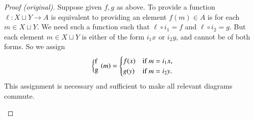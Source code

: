 \documentclass{book}
\def\tn{\textnormal}
\def\to{\rightarrow}
\def\taking{\colon}
\newcommand{\coprodmap}[2]{{\left\{\parbox{.1in}{#1\\#2}\right.}}
\theoremstyle{theoremENG}
\theoremstyle{lemmaENG}
\newtheorem{lemmaENG}[subsubsection]{\begin{english}Lemma\end{english}}
\theoremstyle{propositionENG}
\theoremstyle{corollaryENG}
\theoremstyle{factENG}
\theoremstyle{remarkENG}
\theoremstyle{exampleENG}
\newtheorem{exampleENG}[subsubsection]{\begin{english}Example\end{english}}
\theoremstyle{warningENG}
\theoremstyle{questionENG}
\theoremstyle{guessENG}
\theoremstyle{answerENG}
\theoremstyle{constructionENG}
\theoremstyle{rulesENG}
\theoremstyle{excENG}
\theoremstyle{appENG}
\theoremstyle{definitionENG}
\theoremstyle{notationENG}
\theoremstyle{conjectureENG}
\theoremstyle{postulateENG}
\newenvironment{proofENG}{\begin{proof}[Proof (original)]}{\end{proof}}
\theoremstyle{theoremRUS}
\theoremstyle{lemmaRUS}
\theoremstyle{propositionRUS}
\theoremstyle{corollaryRUS}
\theoremstyle{factRUS}
\theoremstyle{remarkRUS}
\theoremstyle{exampleRUS}
\theoremstyle{warningRUS}
\theoremstyle{questionRUS}
\theoremstyle{guessRUS}
\theoremstyle{answerRUS}
\theoremstyle{constructionRUS}
\theoremstyle{rulesRUS}
\theoremstyle{excRUS}
\theoremstyle{appRUS}
\theoremstyle{definitionRUS}
\theoremstyle{notationRUS}
\theoremstyle{conjectureRUS}
\theoremstyle{postulateRUS}
\begin{document}
\begin{english}
\begin{lemmaENG}
\begin{russian} \end{russian}

\end{lemmaENG}

\begin{proofENG}

Suppose given $f,g$ as above. To provide a function $\ell\taking X\sqcup Y\to A$ is equivalent to providing an element $f(m)\in A$ is for each $m\in X\sqcup Y$. We need such a function such that $\ell\circ i_1=f$ and $\ell\circ i_2=g$. But each element $m\in X\sqcup Y$ is either of the form $i_1x$ or $i_2y$, and cannot be of both forms. So we assign 
$$\coprodmap{f}{g}(m)=\begin{cases}f(x)&\tn{if } m=i_1x,\\ g(y) &\tn{if }m=i_2y.\end{cases}$$
This assignment is necessary and sufficient to make all relevant diagrams commute.

\begin{russian} \end{russian}

\end{proofENG}

\begin{exampleENG}


\end{exampleENG}
\end{english}
\end{document}
